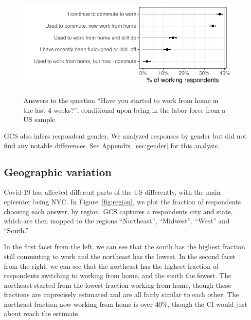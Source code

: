 \documentclass[12pt]{article}
\begin{document}
\begin{figure}
  \caption{Answers to the question ``Have you started to work from home in the last 4 weeks?'', conditional upon being in the labor force from a US sample} \label{fig:working_summary}
\centering
\begin{minipage}{1.0 \linewidth}
  \includegraphics[width = \linewidth]{plots/working_summary.pdf} \\
  \begin{footnotesize}
    \end{footnotesize}
\end{minipage}
\end{figure} 

GCS also infers respondent gender.
We analyzed responses by gender but did not find any notable differences.
See Appendix~\ref{sec:gender} for this analysis. 

\subsection{Geographic variation} 
Covid-19 has affected different parts of the US differently, with the main epicenter being NYC. 
In Figure~\ref{fig:region}, we plot the fraction of respondents choosing each answer, by region.
GCS captures a respondents city and state, which are then mapped to the regions ``Northeast'', ``Midwest'', ``West'' and ``South.'' 

In the first facet from the left, we can see that the south has the highest fraction still commuting to work and the northeast has the lowest. 
In the second facet from the right, we can see that the northeast has the highest fraction of respondents switching to working from home, and the south the fewest.
The northeast started from the lowest fraction working from home, though these fractions are imprecisely estimated and are all fairly similar to each other. 
The northeast fraction now working from home is over 40\%, though the CI would just about reach the \cite{dingel2020} estimate.
\end{document}

